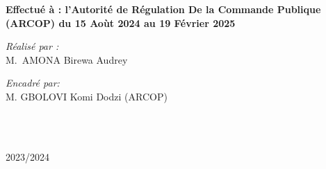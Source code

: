 \begin{titlepage}
\begin{center}
		{\large \bfseries Effectué à : l'Autorité de Régulation De la Commande Publique (ARCOP) du  15 Aoùt 2024 au 19 Février 2025 }\\[1cm]
		\noindent
		\begin{minipage}{0.4\textwidth}
			\begin{flushleft} \large
				\emph{\color{orange!80!black}Réalisé par :}\\
				M.~\textsc{AMONA} Birewa Audrey \\
			\end{flushleft}
		\end{minipage}%
		\begin{minipage}{0.5\textwidth}
			\begin{flushright} \large
				\emph{\color{orange!80!black}Encadré par:} \\
				
				M. \textsc{GBOLOVI} Komi Dodzi (ARCOP)\\
			\end{flushright}
		\end{minipage}\\[1cm]



		\vfill

		{\large \color{orange!80!black}{Année universitaire}\\ \color{blue!80!black}2023/2024}

	\end{center}
\end{titlepage}
